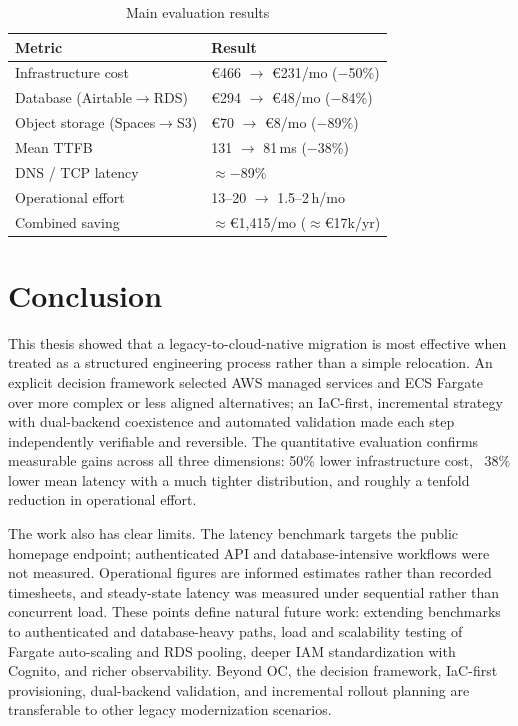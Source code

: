 \documentclass[conference]{IEEEtran}
\begin{document}
\begin{table}[!t]
\caption{Main evaluation results}
\label{tab:results}
\centering
\begin{tabular}{ll}
\toprule
\textbf{Metric} & \textbf{Result} \\
\midrule
Infrastructure cost & \euro466 $\rightarrow$ \euro231/mo ($-$50\%) \\
Database (Airtable$\rightarrow$RDS) & \euro294 $\rightarrow$ \euro48/mo ($-$84\%) \\
Object storage (Spaces$\rightarrow$S3) & \euro70 $\rightarrow$ \euro8/mo ($-$89\%) \\
Mean TTFB & 131 $\rightarrow$ 81\,ms ($-$38\%) \\
DNS / TCP latency & $\approx-$89\% \\
Operational effort & 13--20 $\rightarrow$ 1.5--2\,h/mo \\
Combined saving & $\approx$\euro1{,}415/mo ($\approx$\euro17k/yr) \\
\bottomrule
\end{tabular}
\end{table}

\section{Conclusion}
This thesis showed that a legacy-to-cloud-native migration is most
effective when treated as a structured engineering process rather than a
simple relocation. An explicit decision framework selected AWS managed
services and ECS Fargate over more complex or less aligned alternatives; an
IaC-first, incremental strategy with dual-backend coexistence and automated
validation made each step independently verifiable and reversible. The
quantitative evaluation confirms measurable gains across all three
dimensions: 50\% lower infrastructure cost, ~38\% lower mean latency with a
much tighter distribution, and roughly a tenfold reduction in operational
effort.

The work also has clear limits. The latency benchmark targets the public
homepage endpoint; authenticated API and database-intensive workflows were
not measured. Operational figures are informed estimates rather than
recorded timesheets, and steady-state latency was measured under sequential
rather than concurrent load. These points define natural future work:
extending benchmarks to authenticated and database-heavy paths, load and
scalability testing of Fargate auto-scaling and RDS pooling, deeper IAM
standardization with Cognito, and richer observability. Beyond OC, the
decision framework, IaC-first provisioning, dual-backend validation, and
incremental rollout planning are transferable to other legacy modernization
scenarios.
\end{document}
